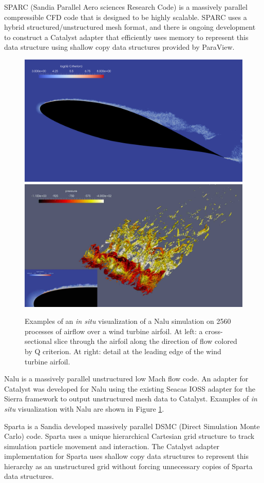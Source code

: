 SPARC (Sandia Parallel Aero sciences Research Code) \cite{SPARC} is a massively parallel compressible CFD code that is designed to be highly scalable.
SPARC uses a hybrid structured/unstructured mesh format, and there is ongoing development to construct a Catalyst adapter that efficiently uses memory to represent this data structure using shallow copy data structures provided by ParaView.

\begin{figure}[t]
  \centering
  \includegraphics[width=.49\linewidth]{projects/2.3.6-NNSA/2.3.6.03-SNL-ATDM/SNL-ATDM-Nalu-Slice}
  \hfill
  \includegraphics[width=.49\linewidth]{projects/2.3.6-NNSA/2.3.6.03-SNL-ATDM/SNL-ATDM-Nalu-Leading}
  \caption{
    Examples of an \emph{in situ} visualization of a Nalu simulation on 2560 processes of airflow over a wind turbine airfoil.
    At left: a cross-sectional slice through the airfoil along the direction of flow colored by Q criterion.
    At right: detail at the leading edge of the wind turbine airfoil.
  }
  \label{fig:SNL-ATDM-Vis-Nalu}
\end{figure}

Nalu \cite{Nalu} is a massively parallel unstructured low Mach flow code.
An adapter for Catalyst was developed for Nalu using the existing Seacas IOSS adapter for the Sierra framework to output unstructured mesh data to Catalyst.
Examples of \emph{in situ} visualization with Nalu are shown in Figure \ref{fig:SNL-ATDM-Vis-Nalu}.

Sparta \cite{Sparta} is a Sandia developed massively parallel DSMC (Direct Simulation Monte Carlo) code.
Sparta uses a unique hierarchical Cartesian grid structure to track simulation particle movement and interaction.
The Catalyst adapter implementation for Sparta uses shallow copy data structures to represent this hierarchy as an unstructured grid without forcing unnecessary copies of Sparta data structures.

